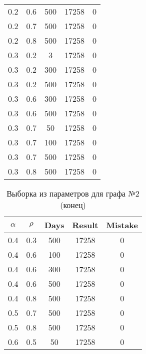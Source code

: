 \begin{table}[ht]
\begin{center}
\begin{threeparttable}
\begin{tabular}{|c|c|c|c|c|}
				 0.2 &  0.6 &  500 & 17258 &     0 \\
				 0.2 &  0.7 &  500 & 17258 &     0 \\
				 0.2 &  0.8 &  500 & 17258 &     0 \\ \hline
				 0.3 &  0.2 &    3 & 17258 &     0 \\
				 0.3 &  0.2 &  300 & 17258 &     0 \\
				 0.3 &  0.2 &  500 & 17258 &     0 \\
				 0.3 &  0.6 &  300 & 17258 &     0 \\
				 0.3 &  0.6 &  500 & 17258 &     0 \\
				 0.3 &  0.7 &   50 & 17258 &     0 \\
				 0.3 &  0.7 &  100 & 17258 &     0 \\
				 0.3 &  0.7 &  500 & 17258 &     0 \\
				 0.3 &  0.8 &  500 & 17258 &     0 \\ \hline
			\end{tabular}	
		\end{threeparttable}
	\end{center}
\end{table}

\clearpage

\begin{table}[ht]
	\small
	\begin{center}
		\begin{threeparttable}
			\caption{Выборка из параметров для графа №2 (конец)}
			\label{tbl:table_graph2_part2}
			\begin{tabular}{|c|c|c|c|c|}
				\hline
				$\alpha$ & $\rho$ & Days & Result & Mistake \\ 
				\hline
				0.4 &  0.3 &  500 & 17258 &     0 \\
				0.4 &  0.6 &  100 & 17258 &     0 \\
				0.4 &  0.6 &  300 & 17258 &     0 \\
				0.4 &  0.6 &  500 & 17258 &     0 \\
				0.4 &  0.8 &  500 & 17258 &     0 \\ \hline
				0.5 &  0.7 &  500 & 17258 &     0 \\
				0.5 &  0.8 &  500 & 17258 &     0 \\ \hline
				0.6 &  0.5 &   50 & 17258 &     0 \\ \hline
			\end{tabular}	
		\end{threeparttable}
	\end{center}
\end{table}


